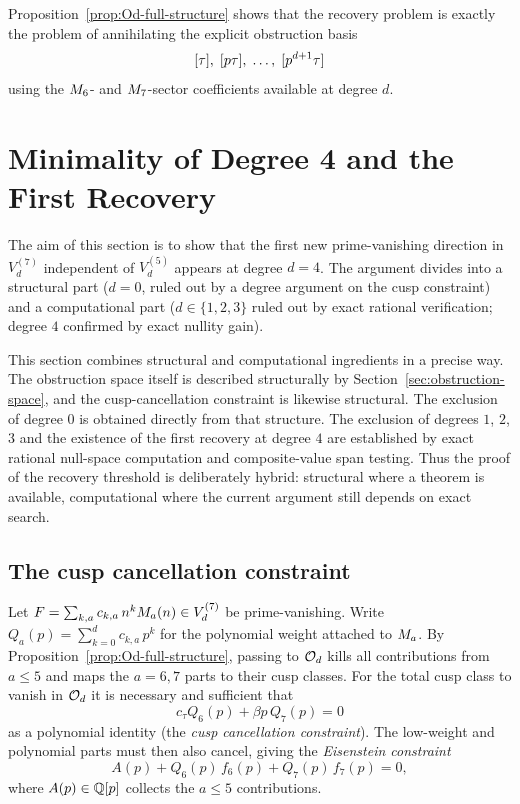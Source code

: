 \documentclass[11pt]{article}
\begin{document}
Proposition~\ref{prop:Od-full-structure} shows that the recovery problem is exactly the
problem of annihilating the explicit obstruction basis
\[
  [\tau],\;[p\tau],\;\dots,\;[p^{d+1}\tau]
\]
using the $M_{6}$- and $M_{7}$-sector coefficients available at degree $d$.

\section{Minimality of Degree 4 and the First Recovery}
\label{sec:minimality}

The aim of this section is to show that the first new prime-vanishing direction in
$V_d^{(7)}$ independent of $V_d^{(5)}$ appears at degree $d=4$.
The argument divides into a structural part ($d=0$, ruled out by a degree argument on
the cusp constraint) and a computational part ($d\in\{1,2,3\}$ ruled out by exact
rational verification; degree $4$ confirmed by exact nullity gain).

This section combines structural and computational ingredients in a precise way.
The obstruction space itself is described structurally by Section~\ref{sec:obstruction-space},
and the cusp-cancellation constraint is likewise structural.
The exclusion of degree $0$ is obtained directly from that structure.
The exclusion of degrees $1$, $2$, $3$ and the existence of the first recovery at degree
$4$ are established by exact rational null-space computation and composite-value span
testing.
Thus the proof of the recovery threshold is deliberately hybrid: structural where a theorem
is available, computational where the current argument still depends on exact search.

\subsection{The cusp cancellation constraint}

Let $F = \sum_{k,a} c_{k,a}\,n^kM_{a}(n)\in V_d^{(7)}$ be prime-vanishing.
Write $Q_a(p)=\sum_{k=0}^d c_{k,a}\,p^k$ for the polynomial weight attached to $M_{a}$.
By Proposition~\ref{prop:Od-full-structure}, passing to $\mathcal{O}_d$ kills all contributions
from $a\le 5$ and maps the $a=6,7$ parts to their cusp classes.
For the total cusp class to vanish in $\mathcal{O}_d$ it is necessary and sufficient that
\begin{equation}
  \label{eq:cusp-constraint}
  c_\tau Q_6(p) + \beta p\,Q_7(p) = 0
\end{equation}
as a polynomial identity (the \emph{cusp cancellation constraint}).
The low-weight and polynomial parts must then also cancel, giving the
\emph{Eisenstein constraint}
\begin{equation}
  \label{eq:eis-constraint}
  A(p) + Q_6(p)\,f_6(p) + Q_7(p)\,f_7(p) = 0,
\end{equation}
where $A(p)\in\mathbb{Q}[p]$ collects the $a\le 5$ contributions.
\end{document}

